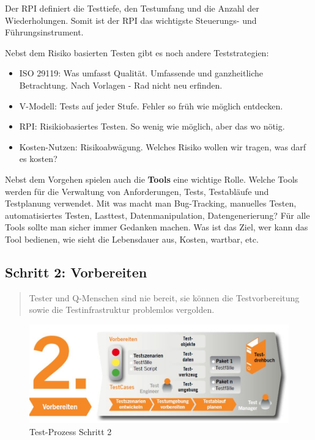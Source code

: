 Der RPI definiert die Testtiefe, den Testumfang und die Anzahl der Wiederholungen. Somit ist der RPI das wichtigste Steuerungs- und Führungsinstrument.

Nebst dem Risiko basierten Testen gibt es noch andere Teststrategien:

\begin{itemize}
	\item ISO 29119: Was umfasst Qualität. Umfassende und ganzheitliche Betrachtung. Nach Vorlagen - Rad nicht neu erfinden.
	\item V-Modell: Tests auf jeder Stufe. Fehler so früh wie möglich entdecken.
	\item RPI: Risikiobasiertes Testen. So wenig wie möglich, aber das wo nötig.
	\item Kosten-Nutzen: Risikoabwägung. Welches Risiko wollen wir tragen, was darf es kosten?
\end{itemize}

Nebst dem Vorgehen spielen auch die \textbf{Tools} eine wichtige Rolle. Welche Tools werden für die Verwaltung von Anforderungen, Tests, Testabläufe und Testplanung verwendet. Mit was macht man Bug-Tracking, manuelles Testen, automatisiertes Testen, Lasttest, Datenmanipulation, Datengenerierung? Für alle Tools sollte man sicher immer Gedanken machen. Was ist das Ziel, wer kann das Tool bedienen, wie sieht die Lebensdauer aus, Kosten, wartbar, etc.

\subsection{Schritt 2: Vorbereiten}

\begin{quote}
	Tester und Q-Menschen sind nie bereit, sie können die Testvorbereitung sowie die Testinfrastruktur problemlos vergolden.
\end{quote}

\begin{figure}[h!]
\centering
\includegraphics[width=0.7\linewidth]{fig/test-prozess-schritt-2}
\caption{Test-Prozess Schritt 2}
\label{fig:test-prozess-schritt-2}
\end{figure}


